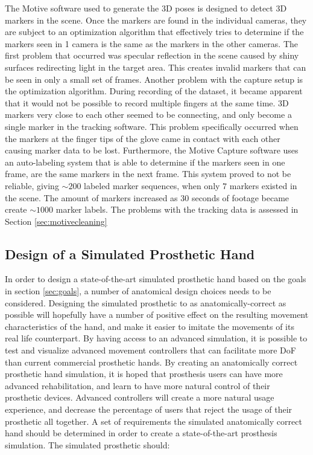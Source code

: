 \documentclass[../main.tex]{subfiles}
\begin{document}
The  Motive software used to generate the 3D poses is designed to detect 3D markers in the scene.
Once the markers are found in the individual cameras, they are subject to an optimization algorithm that effectively tries to determine if the markers seen in 1 camera is the same as the markers in the other cameras.
The first problem that occurred was \gls{specular reflection} in the scene caused by shiny surfaces redirecting light in the target area.
This creates invalid markers that can be seen in only a small set of frames.
Another problem with the capture setup is the optimization algorithm.
During recording of the dataset, it became apparent that it would not be possible to record multiple fingers at the same time.
3D markers very close to each other seemed to be connecting, and only become a single marker in the tracking software.
This problem specifically occurred when the markers at the finger tips of the glove came in contact with each other causing marker data to be lost.
Furthermore, the Motive Capture software uses an auto-labeling system that is able to determine if the markers seen in one frame, are the same markers in the next frame.
This system proved to not be reliable, giving $\sim 200$ labeled marker sequences, when only $7$ markers existed in the scene.
The amount of markers increased as 30 seconds of footage became create $\sim 1000$ marker labels.
The problems with the tracking data is assessed in Section \ref{sec:motivecleaning}

\subsection{Design of a Simulated Prosthetic Hand}
\label{sec:prost_sim}

In order to design a state-of-the-art simulated prosthetic hand based on the goals in section \ref{sec:goals}, a number of anatomical design choices needs to be considered.
Designing the simulated prosthetic to as anatomically-correct as possible will hopefully have a number of positive effect on the resulting movement characteristics of the hand, and make it easier to imitate the movements of its real life counterpart.
By having access to an advanced simulation, it is possible to test and visualize advanced movement controllers that can facilitate more DoF than current commercial prosthetic hands. 
By creating an anatomically correct prosthetic hand simulation, it is hoped that prosthesis users can have more advanced rehabilitation, and learn to have more natural control of their prosthetic devices.
Advanced controllers will create a more natural usage experience, and decrease the percentage of users that reject the usage of their prosthetic all together.
A set of requirements the simulated anatomically correct hand should be determined in order to create a state-of-the-art prosthesis simulation.
The simulated prosthetic should:
\end{document}
